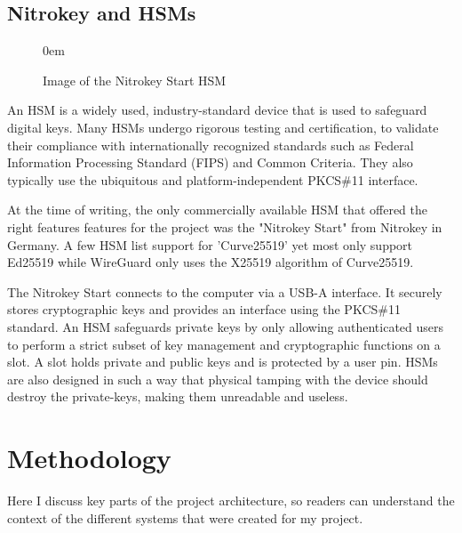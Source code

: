 \documentclass [11pt, proquest] {uwthesis}[2020/02/24]
\begin{document}
\section{Nitrokey and HSMs}

\begin{figure}
\begin{center}
\itemsep0em 
\caption{Image of the Nitrokey Start HSM}
\label{img:nitrokey}
\end{center}
\end{figure}
An HSM is a widely used, industry-standard device that is used to safeguard digital keys. Many HSMs undergo rigorous testing and certification, to validate their compliance with internationally recognized standards such as Federal Information Processing Standard (FIPS) and Common Criteria. They also typically use the ubiquitous and platform-independent PKCS\#11 interface. 

At the time of writing, the only commercially available HSM that offered the right features features for the project was the "Nitrokey Start" from Nitrokey in Germany\cite{nitrokey_nitrokey_2022}. A few HSM list support for 'Curve25519' yet most only support Ed25519 while WireGuard only uses the X25519 algorithm of Curve25519.

The Nitrokey Start connects to the computer via a USB-A interface. It securely stores cryptographic keys and provides an interface using the PKCS\#11 standard.
An HSM safeguards private keys by only allowing authenticated users to perform a strict subset of key management and cryptographic functions on a slot. A slot holds private and public keys and is protected by a user pin. HSMs are also designed in such a way that physical tamping with the device should destroy the private-keys, making them unreadable and useless. 


\chapter {Methodology}
Here I discuss key parts of the project architecture, so readers can understand the context of the different systems that were created for my project.
\end{document}
